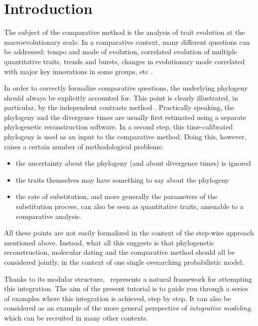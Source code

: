 \section{Introduction}

The subject of the comparative method is the analysis of trait evolution at the macroevolutionary scale.
In a comparative context, many different questions can be addressed: tempo and mode of evolution, correlated evolution of multiple quantitative traits, trends and bursts, changes in evolutionary mode correlated with major key innovations in some groups, etc \citep[for a good introduction see][]{Harvey1991}.

In order to correctly formalize comparative questions, the underlying phylogeny should always be explicitly accounted for. This point is clearly illustrated, in particular, by the independent contrasts method \citep{Felsenstein1985,Huelsenbeck2003}. Practically speaking, the phylogeny and the divergence times are usually first estimated using a separate phylogenetic reconstruction software. In a second step, this time-calibrated phylogeny is used as an input to the comparative method.
Doing this, however, raises a certain number of methodological problems:
\begin{itemize}
\item
the uncertainty about the phylogeny (and about divergence times) is ignored
\item
the traits themselves may have something to say about the phylogeny
\item
the rate of substitution, and more generally the parameters of the substitution process, can also be seen as quantitative traits, amenable to a comparative analysis.
\end{itemize}
All these points are not easily formalized in the context of the step-wise approach mentioned above.
Instead, what all this suggests is that phylogenetic reconstruction, molecular dating and the comparative method should all be considered jointly, in the context of one single overarching probabilistic model.

Thanks to its modular structure, \RevBayes~represents a natural framework for attempting this integration.
The aim of the present tutorial is to guide you through a series of examples where this integration is achieved, step by step.
It can also be considered as an example of the more general perspective of \emph{integrative modeling}, which can be recruited in many other contexts.



